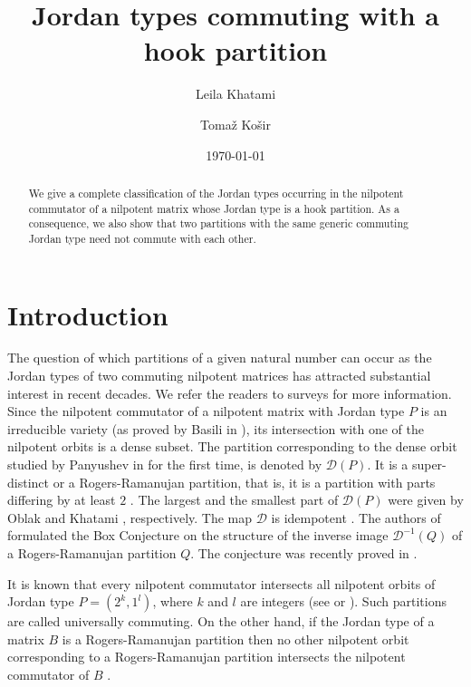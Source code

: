 \documentclass[11pt]{amsproc}
\title{Jordan types commuting with a hook partition}
\author{Leila Khatami}
\author{Toma\v z Ko\v sir}
\date{\today}
\newcommand{\D}{\mathcal{D}}
\begin{document}
\begin{abstract}

 We give a complete classification of the Jordan types occurring in the nilpotent commutator of a nilpotent matrix whose Jordan type is a hook partition. As a consequence, we also show that two partitions with the same generic commuting Jordan type need not commute with each other.
\end{abstract}

\maketitle

\section{Introduction}

The question of which partitions of a given natural number can occur as the Jordan types of two commuting nilpotent matrices has attracted substantial interest in recent decades. We refer the readers to surveys \cite{Kha-S,Kos-S} for more information. Since the nilpotent commutator of a nilpotent matrix with Jordan type $P$ is an irreducible variety (as proved by Basili in \cite[Lem. 2.3]{Bas-2}), its intersection with one of the nilpotent orbits is a dense subset. The partition corresponding to the dense orbit studied by Panyushev in \cite{Pan} for the first time, is denoted by $\mathcal{D}(P)$. It is a super-distinct or a Rogers-Ramanujan partition, that is, it is a partition with parts differing by at least $2$ \cite[Thm. 1.12]{BI}. The largest and the smallest part of $\D(P)$ were given by Oblak \cite{Obl-1} and Khatami \cite{Kha-2}, respectively. The map $\mathcal{D}$ is idempotent \cite[Thm. 6]{KO}. The authors of \cite[Conj. 4.11]{IKvSZ} formulated the Box Conjecture on the structure of the inverse image $\mathcal{D}^{-1}(Q)$ of a Rogers-Ramanujan partition $Q$. The conjecture was recently proved in \cite[Thm. 1]{IKM}. 

It is known that every nilpotent commutator intersects all nilpotent orbits of Jordan type $P=(2^k,1^l)$, where $k$ and $l$ are integers (see \cite[Thm. 2.4]{Obl-3} or \cite[Thm. 4.11]{BW}). Such partitions are called universally commuting. On the other hand, if the Jordan type of a matrix $B$ is a Rogers-Ramanujan partition then no other nilpotent orbit corresponding to a Rogers-Ramanujan partition intersects the nilpotent commutator of $B$ \cite[Thm. 5.3]{Kos-S}. 
\end{document}
